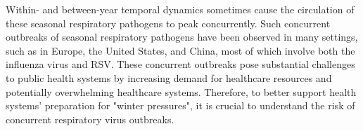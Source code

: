 Within- and between-year temporal dynamics sometimes cause the circulation of these seasonal respiratory pathogens to peak concurrently.
Such concurrent outbreaks of seasonal respiratory pathogens have been observed in many settings, such as in Europe, the United States, and China, most of which involve both the influenza virus and RSV.
These concurrent outbreaks pose substantial challenges to public health systems by increasing demand for healthcare resources and potentially overwhelming healthcare systems.
Therefore, to better support health systems' preparation for "winter pressures", it is crucial to understand the risk of concurrent respiratory virus outbreaks.


